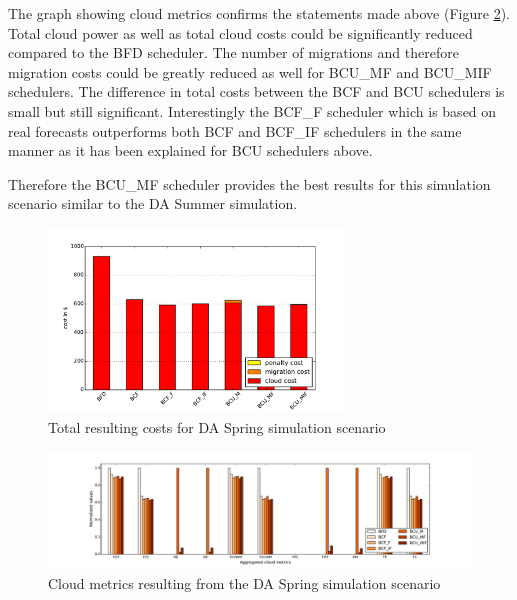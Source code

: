 The graph showing cloud metrics confirms the statements made above (Figure \ref{fig:DA_Spring_cloud_metrics}). Total cloud power as well as total cloud costs could be significantly reduced compared to the BFD scheduler. The number of migrations and therefore migration costs could be greatly reduced as well for BCU\_MF and BCU\_MIF schedulers. The difference in total costs between the BCF and BCU schedulers is small but still significant. Interestingly the BCF\_F scheduler which is based on real forecasts outperforms both BCF and BCF\_IF schedulers in the same manner as it has been explained for BCU schedulers above. 

Therefore the BCU\_MF scheduler provides the best results for this simulation scenario similar to the DA Summer simulation.  

\begin{figure}[htbp]
	\centering
		\includegraphics[width=0.7\textwidth]{figures/evaluation_and_results/DA_Spring_total_cost.pdf}
	\caption{Total resulting costs for DA Spring simulation scenario}
	\label{fig:DA_Spring_total_cost}
\end{figure}

\begin{figure}[htbp]
	\centering
	\hspace*{-1.2in}
		\includegraphics[width=1.50\textwidth]{figures/evaluation_and_results/DA_Spring_cloud_metrics.pdf}
	\caption{Cloud metrics resulting from the DA Spring simulation scenario}
	\label{fig:DA_Spring_cloud_metrics}
\end{figure}




